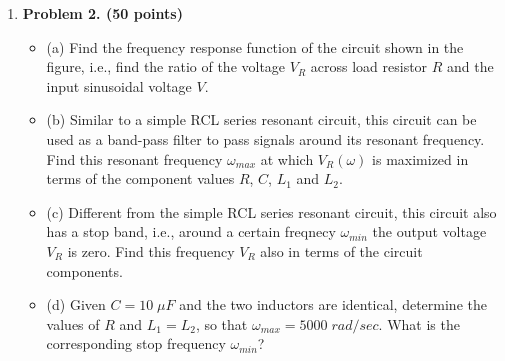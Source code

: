 \begin{enumerate}
\item {\bf Problem 2. (50 points)} 

\begin{itemize}
\item (a) Find the frequency response function of the circuit shown in 
  the figure, i.e., find the ratio of the voltage $V_R$ across load resistor
  $R$ and the input sinusoidal voltage $V$. 

\item (b) Similar to a simple RCL series resonant circuit, this circuit
  can be used as a band-pass filter to pass signals around its resonant 
  frequency. Find this resonant frequency $\omega_{max}$ at which 
  $V_R(\omega)$ is maximized in terms of the component values $R$, $C$, 
  $L_1$ and $L_2$. 

\item (c) Different from the simple RCL series resonant circuit, this 
  circuit also has a stop band, i.e., around a certain freqnecy 
  $\omega_{min}$ the output voltage $V_R$ is zero. Find this frequency 
  $V_R$ also in terms of the circuit components. 

\item (d) Given $C=10\;\mu F$ and the two inductors are identical, 
  determine the values of $R$ and $L_1=L_2$, so that $\omega_{max}=5000
  \;rad/sec$. What is the corresponding stop frequency $\omega_{min}$?

\end{itemize}


%  
%  

\end{enumerate}




